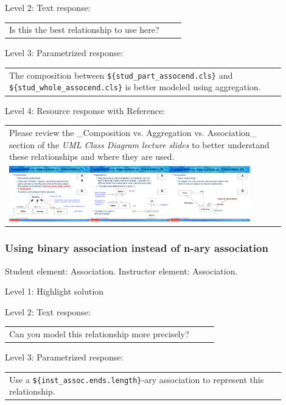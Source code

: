 \noindent Level 2: Text response: \medskip

\begin{tabular}{|p{0.9\linewidth}}
Is this the best relationship to use here?
\end{tabular} \medskip

\noindent Level 3: Parametrized response: \medskip

\begin{tabular}{|p{0.9\linewidth}}
The composition between \verb|${stud_part_assocend.cls}| and \verb|${stud_whole_assocend.cls}| is better modeled using aggregation.
\end{tabular} \medskip

\noindent Level 4: Resource response with Reference: \medskip

\begin{tabular}{|p{0.9\linewidth}}
Please review the _Composition vs. Aggregation vs. Association_ section of 
the \textit{UML Class Diagram lecture slides} to 
better understand these relationships and where they are used.

\\
\includegraphics[width=0.9\textwidth]{images/composition_aggregation_association.png}
\end{tabular} \medskip


\subsubsection{Using binary association instead of n-ary association}

Student element: Association. Instructor element: Association. \medskip

\noindent Level 1: Highlight solution  \medskip

\noindent Level 2: Text response: \medskip

\begin{tabular}{|p{0.9\linewidth}}
Can you model this relationship more precisely?
\end{tabular} \medskip

\noindent Level 3: Parametrized response: \medskip

\begin{tabular}{|p{0.9\linewidth}}
Use a \verb|${inst_assoc.ends.length}|-ary association to represent this relationship.
\end{tabular} \medskip

